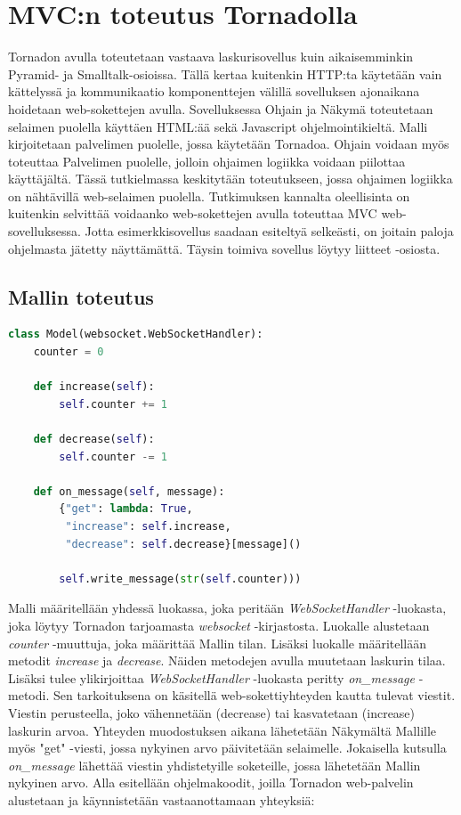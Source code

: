 \documentclass[utf8]{gradu3}
\begin{document}
\chapter{MVC:n toteutus Tornadolla}
Tornadon avulla toteutetaan vastaava laskurisovellus kuin aikaisemminkin Pyramid- ja Smalltalk-osioissa. Tällä kertaa kuitenkin HTTP:ta käytetään vain kättelyssä ja kommunikaatio komponenttejen välillä sovelluksen ajonaikana hoidetaan web-sokettejen avulla. Sovelluksessa Ohjain ja Näkymä toteutetaan selaimen puolella käyttäen HTML:ää sekä Javascript ohjelmointikieltä. Malli kirjoitetaan palvelimen puolelle, jossa käytetään Tornadoa. Ohjain voidaan myös toteuttaa Palvelimen puolelle, jolloin ohjaimen logiikka voidaan piilottaa käyttäjältä. Tässä tutkielmassa keskitytään toteutukseen, jossa ohjaimen logiikka on nähtävillä web-selaimen puolella. Tutkimuksen kannalta oleellisinta on kuitenkin selvittää voidaanko web-sokettejen avulla toteuttaa MVC web-sovelluksessa. Jotta esimerkkisovellus saadaan esiteltyä selkeästi, on joitain paloja ohjelmasta jätetty näyttämättä. Täysin toimiva sovellus löytyy liitteet -osiosta. 

\section{Mallin toteutus}

\begin{lstlisting}[language=Python]
class Model(websocket.WebSocketHandler):
    counter = 0

    def increase(self):
        self.counter += 1

    def decrease(self):
        self.counter -= 1

    def on_message(self, message):
        {"get": lambda: True,
         "increase": self.increase,
         "decrease": self.decrease}[message]()

        self.write_message(str(self.counter)))

\end{lstlisting}

Malli määritellään yhdessä luokassa, joka peritään \emph{WebSocketHandler} -luokasta, joka löytyy Tornadon tarjoamasta \emph{websocket} -kirjastosta. Luokalle alustetaan \emph{counter} -muuttuja, joka määrittää Mallin tilan. Lisäksi luokalle määritellään metodit \emph{increase} ja \emph{decrease}. Näiden metodejen avulla muutetaan laskurin tilaa. Lisäksi tulee ylikirjoittaa \emph{WebSocketHandler} -luokasta peritty \emph{on\_message} -metodi. Sen tarkoituksena on käsitellä web-sokettiyhteyden kautta tulevat viestit. Viestin perusteella, joko vähennetään (decrease) tai kasvatetaan (increase) laskurin arvoa. Yhteyden muodostuksen aikana lähetetään Näkymältä Mallille myös "get" -viesti, jossa nykyinen arvo päivitetään selaimelle. Jokaisella kutsulla \emph{on\_message} lähettää viestin yhdistetyille soketeille, jossa lähetetään Mallin nykyinen arvo. Alla esitellään ohjelmakoodit, joilla Tornadon web-palvelin alustetaan ja käynnistetään vastaanottamaan yhteyksiä:
\end{document}
